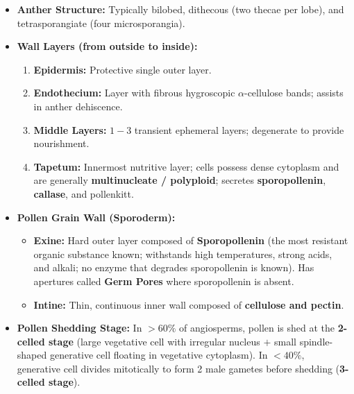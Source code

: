 \documentclass[10pt,a4paper]{article}
\begin{document}
\begin{conceptbox}
\begin{itemize}
  \item \textbf{Anther Structure:} Typically bilobed, dithecous (two thecae per lobe), and tetrasporangiate (four microsporangia).
  \item \textbf{Wall Layers (from outside to inside):}
  \begin{enumerate}
    \item \textbf{Epidermis:} Protective single outer layer.
    \item \textbf{Endothecium:} Layer with fibrous hygroscopic $\alpha$-cellulose bands; assists in anther dehiscence.
    \item \textbf{Middle Layers:} $1-3$ transient ephemeral layers; degenerate to provide nourishment.
    \item \textbf{Tapetum:} Innermost nutritive layer; cells possess dense cytoplasm and are generally \textbf{multinucleate / polyploid}; secretes \textbf{sporopollenin}, \textbf{callase}, and pollenkitt.
  \end{enumerate}
  \item \textbf{Pollen Grain Wall (Sporoderm):}
  \begin{itemize}
    \item \textbf{Exine:} Hard outer layer composed of \textbf{Sporopollenin} (the most resistant organic substance known; withstands high temperatures, strong acids, and alkali; no enzyme that degrades sporopollenin is known). Has apertures called \textbf{Germ Pores} where sporopollenin is absent.
    \item \textbf{Intine:} Thin, continuous inner wall composed of \textbf{cellulose and pectin}.
  \end{itemize}
  \item \textbf{Pollen Shedding Stage:} In $>60\%$ of angiosperms, pollen is shed at the \textbf{2-celled stage} (large vegetative cell with irregular nucleus $+$ small spindle-shaped generative cell floating in vegetative cytoplasm). In $<40\%$, generative cell divides mitotically to form 2 male gametes before shedding (\textbf{3-celled stage}).
\end{itemize}
\end{conceptbox}
\end{document}
